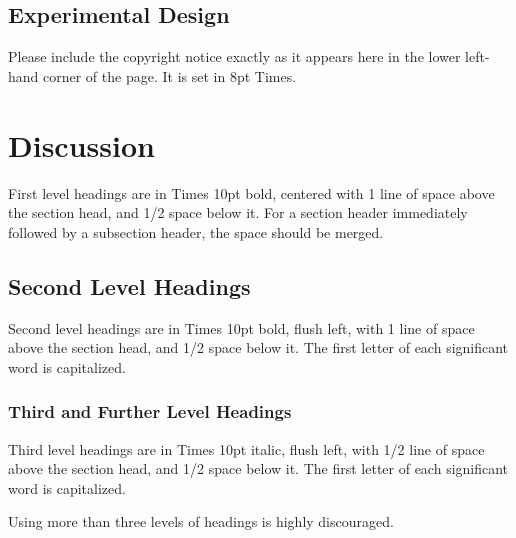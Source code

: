 \documentclass{article}
\begin{document}
\subsection{Experimental Design}

Please include the copyright notice exactly as it appears here in the lower left-hand corner of the page.
It is set in 8pt Times.


\section{Discussion}

First level headings are in Times 10pt bold,
centered with 1 line of space above the section head, and 1/2 space below it.
For a section header immediately followed by a subsection header, the space should be merged.

\subsection{Second Level Headings}

Second level headings are in Times 10pt bold, flush left,
with 1 line of space above the section head, and 1/2 space below it.
The first letter of each significant word is capitalized.

\subsubsection{Third and Further Level Headings}

Third level headings are in Times 10pt italic, flush left,
with 1/2 line of space above the section head, and 1/2 space below it.
The first letter of each significant word is capitalized.

Using more than three levels of headings is highly discouraged.




\end{document}
